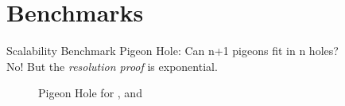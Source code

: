 \documentclass{beamer}
\begin{document}

\section{Benchmarks}


\begin{frame}{Scalability Benchmark}
  Pigeon Hole: Can n+1 pigeons fit in n holes?\\
  No! But the \emph{resolution proof} is exponential.
  \bigskip
  \begin{figure}
  \centering
  \qquad
  \caption{Pigeon Hole for ,  and }
  \label{fig:pigeon}
\end{figure}

\end{frame}
\end{document}
